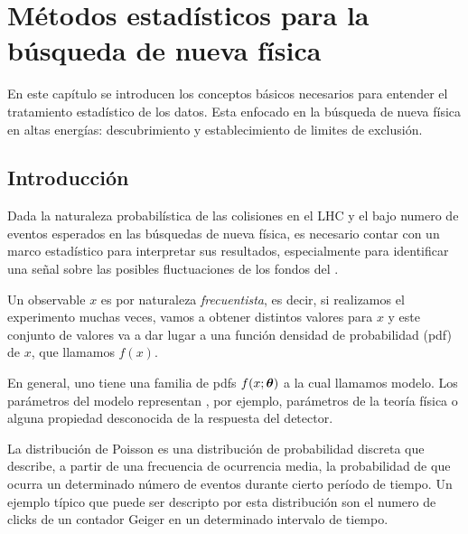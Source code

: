 \chapter{Métodos estadísticos para la búsqueda de nueva física}

En este capítulo se introducen los conceptos básicos necesarios
para entender el tratamiento estadístico de los datos. Esta enfocado
en la búsqueda de nueva física en altas energías: descubrimiento y
establecimiento de limites de exclusión.


\section{Introducción} %


Dada la naturaleza probabilística de las colisiones en el LHC y el bajo numero
de eventos esperados en las búsquedas de nueva física, es necesario contar
con un marco estadístico para interpretar sus resultados, especialmente
para identificar una señal sobre las posibles fluctuaciones de los fondos
del {\SM}.

Un observable $x$ es por naturaleza \emph{frecuentista}, es decir, si realizamos el experimento
muchas veces, vamos a obtener distintos valores para $x$ y este conjunto de valores va a dar lugar
a una función densidad de probabilidad (pdf) de $x$, que llamamos $f(x)$.



En general, uno tiene una familia de pdfs $f(x;\bm{\theta})$ a la cual llamamos modelo.
Los parámetros del modelo representan , por ejemplo, parámetros de la teoría
física o alguna propiedad desconocida de la respuesta del detector.

La distribución de Poisson es una distribución de probabilidad discreta que describe, a partir
de una frecuencia de ocurrencia media, la probabilidad de que ocurra un determinado número de
eventos durante cierto período de tiempo. Un ejemplo  típico que puede ser descripto por esta
distribución son el numero de clicks de un contador Geiger en un determinado intervalo de tiempo.


